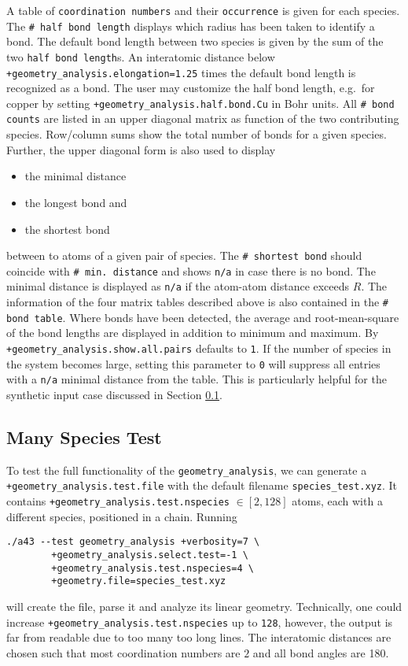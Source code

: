 \documentclass[oribibl]{llncs}
\newcommand{\ttt}[1]{\texttt{#1}}
\begin{document}
A table of \ttt{coordination numbers} and their \ttt{occurrence} is given for each species.
The \ttt{\# half bond length} displays which radius has been taken to identify a bond.
The default bond length between two species is given by the sum of
the two \ttt{half bond length}s.
An interatomic distance below \ttt{+geometry\_analysis.elongation=1.25} 
times the default bond length is recognized as a bond.
%
The user may customize the half bond length, e.g.~for copper 
by setting \ttt{+geometry\_analysis.half.bond.Cu} in Bohr units.
%
All \ttt{\# bond counts} are listed in an upper diagonal matrix as function of the two
contributing species. Row/column sums show the total number of bonds for a given species.
Further, the upper diagonal form is also used to display
\begin{itemize}
	\item the minimal distance
	\item the longest bond and
	\item the shortest bond
\end{itemize}
between to atoms of a given pair of species.
The \ttt{\# shortest bond} should coincide with \ttt{\# min. distance}
and shows \ttt{n/a} in case there is no bond.
The minimal distance is displayed as \ttt{n/a} if the atom-atom distance exceeds $R$.
%
The information of the four matrix tables described above
is also contained in the \ttt{\# bond table}.
Where bonds have been detected, 
the average and root-mean-square of the bond lengths are displayed
in addition to minimum and maximum.
By \ttt{+geometry\_analysis.show.all.pairs} defaults to \ttt{1}.
If the number of species in the system becomes large, setting this
parameter to \ttt{0} will suppress all entries with a \ttt{n/a} minimal distance from the table.
This is particularly helpful for the synthetic input case discussed in Section \ref{sec:many-species-test}.

%
%
\subsection{Many Species Test} \label{sec:many-species-test}
%
To test the full functionality of the \ttt{geometry\_analysis},
we can generate a \ttt{+geometry\_analysis.test.file} 
with the default filename \ttt{species\_test.xyz}.
It contains \ttt{+geometry\_analysis.test.nspecies} $\in [2, 128]$ atoms, each with a
different species, positioned in a chain. Running
\begin{verbatim}
./a43 --test geometry_analysis +verbosity=7 \
        +geometry_analysis.select.test=-1 \
        +geometry_analysis.test.nspecies=4 \
        +geometry.file=species_test.xyz
\end{verbatim}
will create the file, parse it and analyze its linear geometry.
Technically, one could increase \ttt{+geometry\_analysis.test.nspecies} up to \ttt{128},
however, the output is far from readable due to too many too long lines.
The interatomic distances are chosen such that most coordination numbers
are $2$ and all bond angles are 180\degree{}.
%
\end{document}
